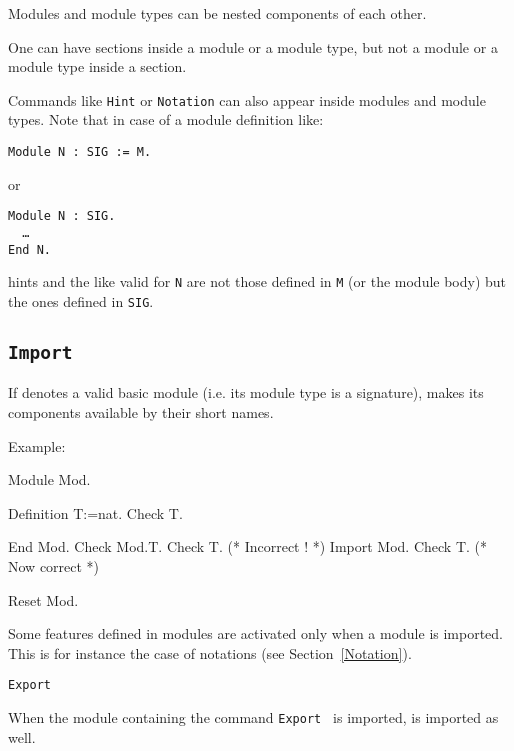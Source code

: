 \begin{Remarks}
\item Modules and module types can be nested components of each other.
\item One can have sections inside a module or a module type, but
  not a module or a module type inside a section.
\item Commands like \texttt{Hint} or \texttt{Notation} can
  also appear inside modules and module types. Note that in case of a
  module definition like:

    \smallskip
    \noindent
    {\tt Module N : SIG := M.} 
    \smallskip

    or

    \smallskip
    {\tt Module N : SIG.\\
      \ \ \dots\\
      End N.}
    \smallskip 
    
    hints and the like valid for \texttt{N} are not those defined in
    \texttt{M} (or the module body) but the ones defined in
    \texttt{SIG}.

\end{Remarks}

\subsection{\tt Import {\qualid}
\label{Import}}

If {\qualid} denotes a valid basic module (i.e. its module type is a
signature), makes its components available by their short names.

Example:

\begin{coq_example}
Module Mod.
\end{coq_example}
\begin{coq_example}
  Definition T:=nat.
  Check T.
\end{coq_example}
\begin{coq_example}
End Mod.
Check Mod.T.
Check T. (* Incorrect ! *)
Import Mod.
Check T. (* Now correct *)
\end{coq_example}
\begin{coq_eval}
Reset Mod.
\end{coq_eval}

Some features defined in modules are activated only when a module is
imported. This is for instance the case of notations (see
Section~\ref{Notation}).

\begin{Variants}
\item{\tt Export {\qualid}}

  When the module containing the command {\tt Export {\qualid}} is
  imported, {\qualid} is imported as well.
\end{Variants}

